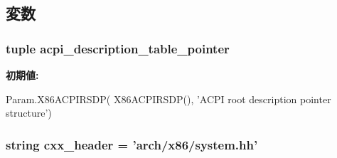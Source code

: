 \subsection{変数}
\hypertarget{classX86System_1_1X86System_a890999088f0769472687e9e4b30bc682}{
\subsubsection[{acpi\_\-description\_\-table\_\-pointer}]{\setlength{\rightskip}{0pt plus 5cm}tuple {\bf acpi\_\-description\_\-table\_\-pointer}}}
\label{classX86System_1_1X86System_a890999088f0769472687e9e4b30bc682}
{\bfseries 初期値:}
\begin{DoxyCode}
Param.X86ACPIRSDP(
            X86ACPIRSDP(), 'ACPI root description pointer structure')
\end{DoxyCode}
\hypertarget{classX86System_1_1X86System_a17da7064bc5c518791f0c891eff05fda}{
\subsubsection[{cxx\_\-header}]{\setlength{\rightskip}{0pt plus 5cm}string {\bf cxx\_\-header} = 'arch/x86/system.hh'}}
\label{classX86System_1_1X86System_a17da7064bc5c518791f0c891eff05fda}


